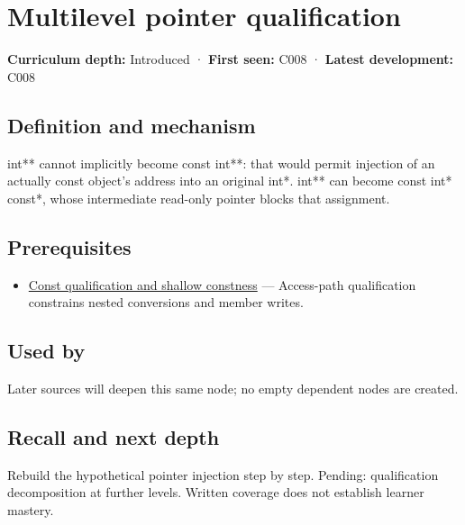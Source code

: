 \hypertarget{appendix-5e1a7561cd98}{}\label{referencestart:appendix-5e1a7561cd98}
\section{Multilevel pointer qualification}\label{appendix-5e1a7561cd98-multilevel-pointer-qualification}

\textbf{Curriculum depth:} Introduced · \textbf{First seen:} C008 · \textbf{Latest development:} C008

\subsection{Definition and mechanism}\label{appendix-5e1a7561cd98-definition-and-mechanism}

int** cannot implicitly become const int**: that would permit injection of an actually const object's address into an original int*. int** can become const int* const*, whose intermediate read-only pointer blocks that assignment.

\subsection{Prerequisites}\label{appendix-5e1a7561cd98-prerequisites}

\begin{itemize}
\tightlist
\item
  \hyperref[appendix-c25d60fed375]{Const qualification and shallow constness} --- Access-path qualification constrains nested conversions and member writes.
\end{itemize}

\subsection{Used by}\label{appendix-5e1a7561cd98-used-by}

Later sources will deepen this same node; no empty dependent nodes are created.

\subsection{Recall and next depth}\label{appendix-5e1a7561cd98-recall-and-next-depth}

Rebuild the hypothetical pointer injection step by step. Pending: qualification decomposition at further levels. Written coverage does not establish learner mastery.

